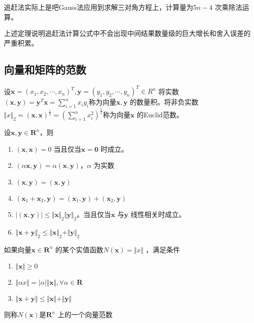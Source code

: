 \documentclass[a4paper]{article}
\begin{document}
追赶法实际上是吧Gauss法应用到求解三对角方程上，计算量为$5n - 4$ 次乘除法运算。

上述定理说明追赶法计算公式中不会出现中间结果数量级的巨大增长和舍入误差的严重积累。

\subsection{向量和矩阵的范数}
\begin{definition}
	设$\mathbf{x} = (x_1, x_2, \cdots, x_{n})^{T}, \mathbf{y} = (y_1, y_2, \cdots, y_{n})^{T} \in R^{n}$ 将实数$(\mathbf{x}, \mathbf{y}) = \mathbf{y}^{T} \mathbf{x} = \sum_{i=1}^{n} x_{i} y_{i}$称为向量$\mathbf{x, y}$ 的数量积。将非负实数$\Vert x \Vert_2 = (\mathbf{x}, \mathbf{x})^{\frac{1}{2}} = (\sum_{i=1}^{n} x_{i}^2)^{\frac{1}{2}}$称为向量$\mathbf{x}$ 的Euclid范数。
\end{definition}

\begin{theorem}
	设$\mathbf{x, y} \in \mathbf{R}^{n}$，则
	\begin{enumerate}
		\item $(\mathbf{x}, \mathbf{x}) = 0$ 当且仅当$\mathbf{x} = \mathbf{0}$ 时成立。
		\item $(\alpha \mathbf{x}, \mathbf{y}) = \alpha (\mathbf{x}, \mathbf{y})$，$\alpha$ 为实数
		\item $(\mathbf{x}, \mathbf{y}) = (\mathbf{x}, \mathbf{y})$ 
		\item $(\mathbf{x}_1 + \mathbf{x}_2, \mathbf{y}) = (\mathbf{x}_1, \mathbf{y}) + (\mathbf{x}_2, \mathbf{y})$
		\item $| (\mathbf{x}, \mathbf{y}) | \le \Vert \mathbf{x} \Vert_2 \Vert \mathbf{y} \Vert_2$。当且仅当$\mathbf{x}$ 与$\mathbf{y}$ 线性相关时成立。
		\item $\Vert \mathbf{x} + \mathbf{y} \Vert_2 \le \Vert \mathbf{x} \Vert_2 + \Vert \mathbf{y} \Vert_2$
	\end{enumerate}
\end{theorem}

\begin{definition}
	如果向量$\mathbf{x} \in  \mathbf{R}^{n}$ 的某个实值函数$N(\mathbf{x}) = \Vert x \Vert$ ，满足条件
	\begin{enumerate}
		\item $\Vert \mathbf{x} \Vert \ge 0$ 
		\item $\Vert \alpha x \Vert = |\alpha| \Vert \mathbf{x} \Vert, \forall \alpha \in \mathbf{R} $ 
		\item $\Vert \mathbf{x} + \mathbf{y} \Vert \le \Vert \mathbf{x} \Vert + \Vert \mathbf{y} \Vert$
	\end{enumerate}
	则称$N(\mathbf{x})$是$\mathbf{R}^{n}$ 上的一个向量范数
\end{definition}
\end{document}
